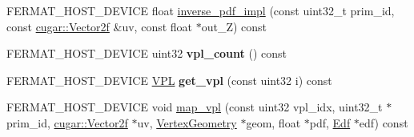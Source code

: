 \begin{DoxyCompactItemize}
\item 
F\+E\+R\+M\+A\+T\+\_\+\+H\+O\+S\+T\+\_\+\+D\+E\+V\+I\+CE float \hyperlink{struct_mesh_light_a3c6e89823dc653d7c0b0ce28c0f8f770}{inverse\+\_\+pdf\+\_\+impl} (const uint32\+\_\+t prim\+\_\+id, const \hyperlink{structcugar_1_1_vector}{cugar\+::\+Vector2f} \&uv, const float $\ast$out\+\_\+Z) const
\item 
\mbox{\label{struct_mesh_light_af8131c05153454d4b66a91c4ba60ad0b}} 
F\+E\+R\+M\+A\+T\+\_\+\+H\+O\+S\+T\+\_\+\+D\+E\+V\+I\+CE uint32 {\bfseries vpl\+\_\+count} () const
\item 
\mbox{\label{struct_mesh_light_a02d804cf3aa7a4c78bacfbc09703d2e4}} 
F\+E\+R\+M\+A\+T\+\_\+\+H\+O\+S\+T\+\_\+\+D\+E\+V\+I\+CE \hyperlink{struct_v_p_l}{V\+PL} {\bfseries get\+\_\+vpl} (const uint32 i) const
\item 
F\+E\+R\+M\+A\+T\+\_\+\+H\+O\+S\+T\+\_\+\+D\+E\+V\+I\+CE void \hyperlink{struct_mesh_light_a2282bb91c6d716231dbf81701fd6c05c}{map\+\_\+vpl} (const uint32 vpl\+\_\+idx, uint32\+\_\+t $\ast$prim\+\_\+id, \hyperlink{structcugar_1_1_vector}{cugar\+::\+Vector2f} $\ast$uv, \hyperlink{struct_vertex_geometry}{Vertex\+Geometry} $\ast$geom, float $\ast$pdf, \hyperlink{struct_edf}{Edf} $\ast$edf) const
\end{DoxyCompactItemize}
